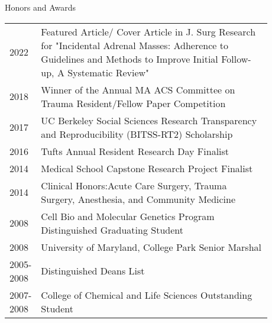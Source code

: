 \documentclass{resume} %
\begin{document}
\pagebreak
\begin{rSection}{Honors and Awards}
   \begin{tabular}{lp{0.88\linewidth}}
   2022 & Featured Article/ Cover Article in J. Surg Research for "Incidental Adrenal Masses: Adherence to Guidelines and Methods to Improve Initial Follow-up, A Systematic Review" \\
   2018 & Winner of the Annual MA ACS Committee on Trauma Resident/Fellow Paper Competition\\
   2017 & UC Berkeley Social Sciences Research Transparency and Reproducibility (BITSS-RT2) Scholarship \\
   2016 &Tufts Annual Resident Research Day Finalist\\
   2014 & Medical School Capstone Research Project Finalist \\
   2014 & Clinical Honors:Acute Care Surgery, Trauma Surgery, Anesthesia, and Community Medicine \\
   2008 & Cell Bio and Molecular Genetics Program Distinguished Graduating Student\\
   2008 & University of Maryland, College Park Senior Marshal \\
   2005-2008& Distinguished Deans List \\
   2007-2008 &  College of Chemical and Life Sciences Outstanding Student
\end{tabular}
   \end{rSection}
   

\end{document}
